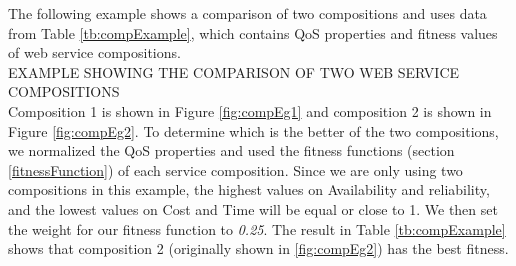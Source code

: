 The following example shows a comparison of two compositions and uses data from Table \ref{tb:compExample}, which contains QoS properties and fitness values of web service compositions. \\

EXAMPLE SHOWING THE COMPARISON OF TWO WEB SERVICE COMPOSITIONS \\

Composition 1 is shown in Figure \ref{fig:compEg1} and composition  2 is shown in Figure \ref{fig:compEg2}. To determine which is the better of the two compositions, we normalized the QoS properties and used the fitness functions (section \ref{fitnessFunction}) of each service composition. Since we are only using two compositions in this example, the highest values on Availability and reliability, and the lowest values on Cost and Time will be equal or close to 1. We then set the weight for our fitness function to \emph{0.25}. The result in Table \ref{tb:compExample} shows that composition 2 (originally shown in \ref{fig:compEg2}) has the best fitness.  \par


\begin{table}[h]
\centering
\caption{Comparison of two web service compositions}
\label{tb:compExample}
\end{table}